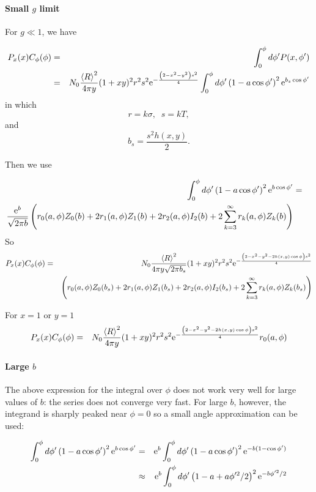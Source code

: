 \documentclass[11pt,openany]{report}
\newcommand{\e}{{\rm e}}
\begin{document}
{{\paragraph{Small $g$ limit}
For $g\ll 1$, we have


\begin{eqnarray}
P_x(x)C_{\phi}(\phi)&=&\int_{0}^{\phi}d\phi' P(x,\phi')\\
&=& N_{0}\frac{\left<R\right>^{2}}{4\pi y}(1+xy)^{2}r^{2}s^{2}\e^{-\frac{\left(2-x^{2}-y^{2}\right)s^{2}}{4}}
\int_{0}^{\phi}d\phi'\left(1-a\cos\phi'\right)^{2}\e^{b_{s}\cos\phi'}
\end{eqnarray}
in which
$$r=k\sigma,\;\;s=kT,$$
and
$$b_{s}=\frac{s^{2}h(x,y)}{2}.$$

Then we use

\begin{eqnarray}
\int_{0}^{\phi}d\phi'\left(1-a\cos\phi' \right)^{2}\e^{b\cos\phi'}&=&\\
\frac{\e^{b}}{\sqrt{2\pi b}}\left(
r_{0}(a,\phi)Z_{0}(b)+2r_{1}(a,\phi)Z_{1}(b)+2r_{2}(a,\phi)I_{2}(b)+2\sum_{k=3}^{\infty}r_{k}(a,\phi)Z_{k}(b)\right)
\end{eqnarray}
So
\begin{eqnarray}
P_x(x)C_{\phi}(\phi)&=& N_{0}\frac{\left<R\right>^{2}}{4\pi y\sqrt{2\pi b_{s}}}(1+xy)^{2}r^{2}s^{2}\e^{-\frac{\left(2-x^{2}-y^{2}-2h(x,y)\cos\phi\right)s^{2}}{4}}\\
&&\left(
r_{0}(a,\phi)Z_{0}(b_{s})+2r_{1}(a,\phi)Z_{1}(b_{s})+2r_{2}(a,\phi)I_{2}(b_{s})+2\sum_{k=3}^{\infty}r_{k}(a,\phi)Z_{k}(b_{s})\right)
\end{eqnarray}

For $x=1$ or $y=1$
\begin{eqnarray}
P_x(x)C_{\phi}(\phi)&=& N_{0}\frac{\left<R\right>^{2}}{4\pi y}(1+xy)^{2}r^{2}s^{2}\e^{-\frac{\left(2-x^{2}-y^{2}-2h(x,y)\cos\phi\right)s^{2}}{4}}
r_{0}(a,\phi)\end{eqnarray}




\paragraph{Large $b$}
The above expression for the integral over $\phi$ does not work very well for large values of $b$: the series does not converge very fast. For large $b$, however, the integrand  is sharply peaked near $\phi=0$ so a small angle approximation can be used:

\begin{eqnarray}
\int_{0}^{\phi}d\phi'\left(1-a\cos\phi' \right)^{2}\e^{b\cos\phi'}&=&\e^{b}\int_{0}^{\phi}d\phi'\left(1-a\cos\phi' \right)^{2}\e^{-b(1-\cos\phi')}\\
&\approx&\e^{b}\int_{0}^{\phi}d\phi'\left(1-a+a\phi'^{2}/2\right)^{2}\e^{-b\phi'^{2}/2}\end{eqnarray}

}}
\end{document}
